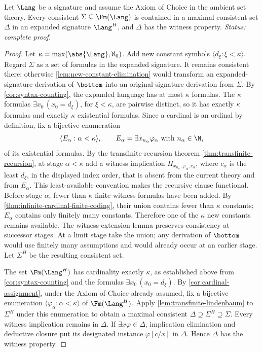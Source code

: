 \begin{lemma}
\label{lem:henkin-lindenbaum}
Let \(\Lang\) be a signature and assume the Axiom of Choice in the
ambient set theory.  Every consistent
\(\Sigma\subseteq\Fm(\Lang)\) is contained in a maximal consistent set
\(\Delta\) in an expanded signature \(\Lang^H\), and \(\Delta\) has the
witness property.
\textit{Status: complete proof.}
\end{lemma}
\begin{proof}
 Let \(\kappa=\max(\abs{\Lang},\aleph_0)\).  Add new constant symbols
 \(\langle d_\xi:\xi<\kappa\rangle\).  Regard \(\Sigma\) as a set of formulas
 in the expanded signature.
It remains consistent there: otherwise
\cref{lem:new-constant-elimination} would transform an expanded-signature
derivation of \(\bottom\) into an original-signature derivation from
\(\Sigma\).  By \cref{cor:syntax-counting}, the expanded
language has at most \(\kappa\) formulas.  The \(\kappa\) formulas
\(\exists x_0\,(x_0=d_\xi)\), for \(\xi<\kappa\), are pairwise distinct, so
it has exactly \(\kappa\) formulas and exactly \(\kappa\) existential formulas.
Since a cardinal
is an ordinal by definition, fix a bijective enumeration
\[
  \langle E_\alpha:\alpha<\kappa\rangle,
  \qquad
  E_\alpha=\exists x_{n_\alpha}\varphi_\alpha
  \text{ with }n_\alpha\in\N,
\]
 of its existential formulas.  By the transfinite-recursion theorem
\cref{thm:transfinite-recursion}, at stage
\(\alpha<\kappa\) add a witness implication
\(H_{x_{n_\alpha},\varphi_\alpha,c_\alpha}\), where \(c_\alpha\) is the
least \(d_\xi\), in the displayed index order, that is absent from the current
theory and from \(E_\alpha\).  This least-available convention makes the
recursive clause functional.  Before stage \(\alpha\), fewer than
\(\kappa\) finite witness formulas have been added.  By
\cref{thm:infinite-cardinal-finite-coding}, their union contains fewer than
\(\kappa\) constants; \(E_\alpha\) contains only finitely many constants.
Therefore one of the \(\kappa\) new constants remains available.  The
witness-extension lemma
preserves consistency at successor stages.  At a limit stage take the union;
any derivation of \(\bottom\) would use finitely many assumptions and would
already occur at an earlier stage.  Let \(\Sigma^H\) be the resulting
consistent set.

The set \(\Fm(\Lang^H)\) has cardinality exactly \(\kappa\), as
established above from \cref{cor:syntax-counting} and the
formulas \(\exists x_0\,(x_0=d_\xi)\).  By
\cref{cor:cardinal-assignment}, under the Axiom of Choice already assumed,
fix a bijective enumeration
\(\langle\varphi_\alpha:\alpha<\kappa\rangle\) of \(\Fm(\Lang^H)\).
Apply \cref{lem:transfinite-lindenbaum} to \(\Sigma^H\) under this
enumeration to obtain a maximal consistent
\(\Delta\supseteq\Sigma^H\supseteq\Sigma\).  Every witness implication remains
in \(\Delta\).  If \(\exists x\varphi\in\Delta\), implication elimination
and deductive closure put its designated instance \(\varphi[c/x]\) in
\(\Delta\).  Hence \(\Delta\) has the witness property.
\end{proof}

